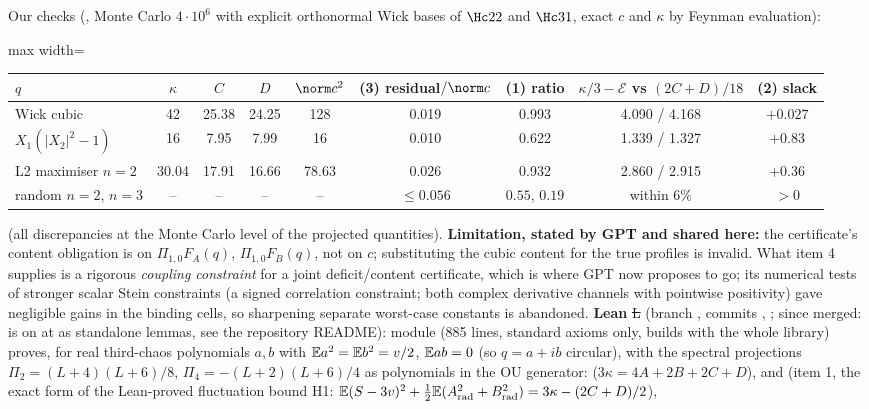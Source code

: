 Our checks (, Monte Carlo $4\cdot10^6$ with explicit orthonormal Wick bases of $\Hc22$ and $\Hc31$, exact $c$ and $\kappa$ by Feynman evaluation):
\begin{center}\small
\begin{adjustbox}{max width=\linewidth}\begin{tabular}{lcccccccc}\toprule
$q$ & $\kappa$ & $C$ & $D$ & $\norm c^2$ & (3) residual$/\norm c$ & (1) ratio & $\kappa/3-\mathcal E$ vs $(2C{+}D)/18$ & (2) slack\\\midrule
Wick cubic & 42 & 25.38 & 24.25 & 128 & 0.019 & 0.993 & 4.090 / 4.168 & $+0.027$\\
$X_1(|X_2|^2-1)$ & 16 & 7.95 & 7.99 & 16 & 0.010 & 0.622 & 1.339 / 1.327 & $+0.83$\\
L2 maximiser $n=2$ & 30.04 & 17.91 & 16.66 & 78.63 & 0.026 & 0.932 & 2.860 / 2.915 & $+0.36$\\
random $n=2$, $n=3$ & -- & -- & -- & -- & $\le0.056$ & $0.55$, $0.19$ & within $6\%$ & $>0$\\\bottomrule
\end{tabular}\end{adjustbox}
\end{center}
(all discrepancies at the Monte Carlo level of the projected quantities). \textbf{Limitation, stated by GPT and shared here:} the certificate's content obligation is on $\Pi_{1,0}F_A(q)$,
$\Pi_{1,0}F_B(q)$, not on $c$; substituting the cubic content for the true profiles is invalid. What item 4 supplies is a rigorous \emph{coupling constraint} for a joint
deficit/content certificate, which is where GPT now proposes to go; its numerical tests of stronger scalar Stein constraints (a signed correlation constraint; both complex derivative
channels with pointwise positivity) gave negligible gains in the binding cells, so sharpening separate worst-case constants is abandoned. \textbf{Lean} \st{L} (branch , commits , ; since merged:  is on  at  as standalone lemmas, see the repository README): module  (885 lines, standard axioms only,
builds with the whole library) proves, for real third-chaos polynomials $a,b$ with $\mathbb E a^2=\mathbb E b^2=v/2$, $\mathbb E ab=0$ (so $q=a+ib$ circular), with the spectral projections
$\Pi_2=(L+4)(L+6)/8$, $\Pi_4=-(L+2)(L+6)/4$ as polynomials in the OU generator:  ($3\kappa=4A+2B+2C+D$),  and
 (item 1, the exact form of the Lean-proved fluctuation bound H1: $\mathbb E(S-3v)^2+\tfrac12\mathbb E(A_{\rm rad}^2+B_{\rm rad}^2)=3\kappa-(2C+D)/2$),
